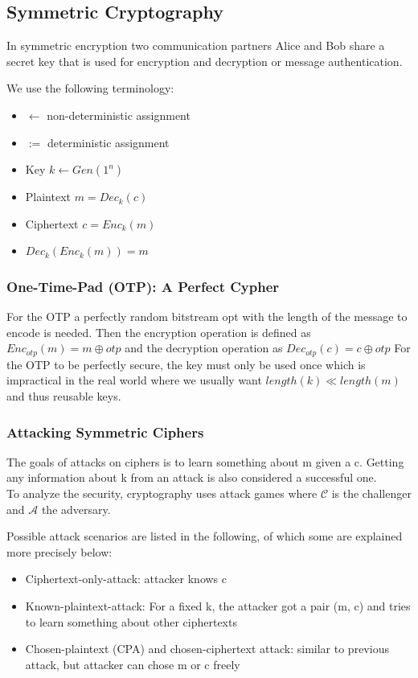 \subsection{Symmetric Cryptography}
In symmetric encryption two communication partners Alice and Bob share a secret key that is used for encryption and decryption or message authentication.

We use the following terminology:
\begin{itemize}[noitemsep, topsep=0pt]
  \item $\leftarrow$ non-deterministic assignment
  \item $:=$ deterministic assignment
  \item Key $k \leftarrow Gen(1^n)$
  \item Plaintext $m = Dec_k(c)$
  \item Ciphertext $c = Enc_k(m)$
  \item $Dec_k(Enc_k(m)) = m$
\end{itemize}

\subsubsection{One-Time-Pad (OTP): A Perfect Cypher}
For the OTP a perfectly random bitstream opt with the length of the message to encode is needed.
Then the encryption operation is defined as $Enc_{otp}(m) = m \oplus otp$ and the decryption operation as $Dec_{otp}(c) = c \oplus otp$
For the OTP to be perfectly secure, the key must only be used once which is impractical in the real world where we usually want $length(k) \ll length(m)$ and thus reusable keys.

\subsubsection{Attacking Symmetric Ciphers}
The goals of attacks on ciphers is to learn something about m given a c.
Getting any information about k from an attack is also considered a successful one.\\

To analyze the security, cryptography uses attack games where $\mathcal{C}$ is the challenger and $\mathcal{A}$ the adversary.

Possible attack scenarios are listed in the following, of which some are explained more precisely below:
\begin{itemize}[noitemsep, topsep=0pt]
  \item Ciphertext-only-attack: attacker knows c
  \item Known-plaintext-attack: For a fixed k, the attacker got a pair (m, c) and tries to learn something about other ciphertexts
  \item Chosen-plaintext (CPA) and chosen-ciphertext attack: similar to previous attack, but attacker can chose m or c freely
\end{itemize}
\vspace{10pt}


